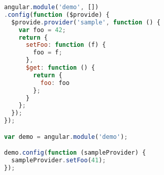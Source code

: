 \begin{lstlisting}[language=JavaScript]
angular.module('demo', [])
.config(function ($provide) {
  $provide.provider('sample', function () {
    var foo = 42;
    return {
      setFoo: function (f) {
        foo = f;
      },
      $get: function () {
        return {
          foo: foo
        };
      }
    };
  });
});

var demo = angular.module('demo');

demo.config(function (sampleProvider) {
  sampleProvider.setFoo(41);
});
\end{lstlisting}